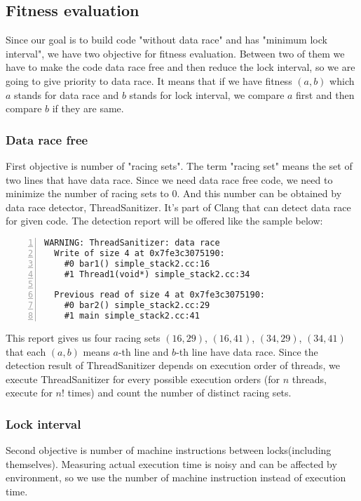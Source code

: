 \subsection{Fitness evaluation}
Since our goal is to build code "without data race" and has "minimum lock interval", we have two objective for fitness evaluation. Between two of them we have to make the code data race free and then reduce the lock interval, so we are going to give priority to data race. It means that if we have fitness $(a, b)$ which $a$ stands for data race and $b$ stands for lock interval, we compare $a$ first and then compare $b$ if they are same.

\subsubsection{Data race free}
First objective is number of "racing sets". The term "racing set" means the set of two lines that have data race. Since we need data race free code, we need to minimize the number of racing sets to 0. And this number can be obtained by data race detector, ThreadSanitizer. It's part of Clang that can detect data race for given code. The detection report will be offered like the sample below:

\begin{lstlisting}[frame=tb, xleftmargin=2em, framexleftmargin=1.5em, numbers=left]
WARNING: ThreadSanitizer: data race
  Write of size 4 at 0x7fe3c3075190:
    #0 bar1() simple_stack2.cc:16
    #1 Thread1(void*) simple_stack2.cc:34

  Previous read of size 4 at 0x7fe3c3075190:
    #0 bar2() simple_stack2.cc:29
    #1 main simple_stack2.cc:41
\end{lstlisting}

This report gives us four racing sets $(16, 29)$, $(16, 41)$, $(34, 29)$, $(34, 41)$ that each $(a, b)$ means $a$-th line and $b$-th line have data race. Since the detection result of ThreadSanitizer depends on execution order of threads, we execute ThreadSanitizer for every possible execution orders (for $n$ threads, execute for $n!$ times) and count the number of distinct racing sets.
 
\subsubsection{Lock interval}
Second objective is number of machine instructions between locks(including themselves). Measuring actual execution time is noisy and can be affected by environment, so we use the number of machine instruction instead of execution time.

